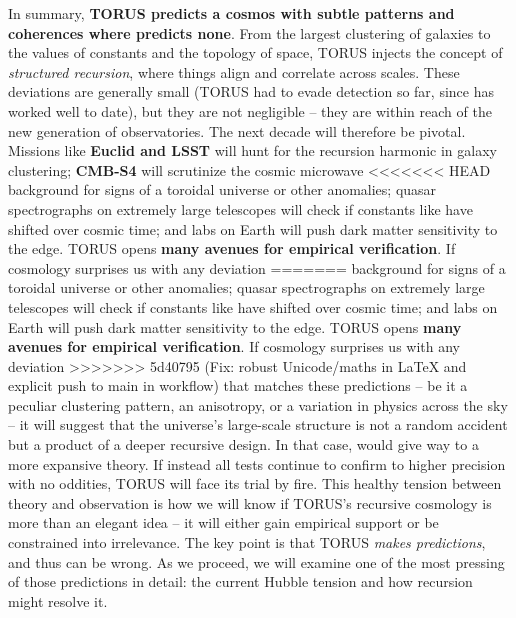 \documentclass[]{article}
\begin{document}
In summary, \textbf{TORUS predicts a cosmos with subtle patterns and
coherences where \LambdaCDM predicts none}. From the largest clustering of
galaxies to the values of constants and the topology of space, TORUS
injects the concept of \emph{structured recursion}, where things align
and correlate across scales. These deviations are generally small (TORUS
had to evade detection so far, since \LambdaCDM has worked well to date), but
they are not negligible -- they are within reach of the new generation
of observatories. The next decade will therefore be pivotal. Missions
like \textbf{Euclid and LSST} will hunt for the recursion harmonic in
galaxy clustering; \textbf{CMB-S4} will scrutinize the cosmic microwave
<<<<<<< HEAD
background for signs of a toroidal universe or other
anomalies\hspace{0pt}; quasar spectrographs on extremely large
telescopes will check if constants like \alpha have shifted over cosmic
time\hspace{0pt}; and labs on Earth will push dark matter sensitivity to
the edge. TORUS opens \textbf{many avenues for empirical
verification}\hspace{0pt}. If cosmology surprises us with any deviation
=======
background for signs of a toroidal universe or other anomalies​; quasar
spectrographs on extremely large telescopes will check if constants like
\alpha have shifted over cosmic time​; and labs on Earth will push dark
matter sensitivity to the edge. TORUS opens \textbf{many avenues for
empirical verification}​. If cosmology surprises us with any deviation
>>>>>>> 5d40795 (Fix: robust Unicode/maths in LaTeX and explicit push to main in workflow)
that matches these predictions -- be it a peculiar clustering pattern,
an anisotropy, or a variation in physics across the sky -- it will
suggest that the universe's large-scale structure is not a random
accident but a product of a deeper recursive design. In that case, \LambdaCDM
would give way to a more expansive theory. If instead all tests continue
to confirm \LambdaCDM to higher precision with no oddities, TORUS will face
its trial by fire. This healthy tension between theory and observation
is how we will know if TORUS's recursive cosmology is more than an
elegant idea -- it will either gain empirical support or be constrained
into irrelevance. The key point is that TORUS \emph{makes predictions},
and thus can be wrong. As we proceed, we will examine one of the most
pressing of those predictions in detail: the current Hubble tension and
how recursion might resolve it.
\end{document}
